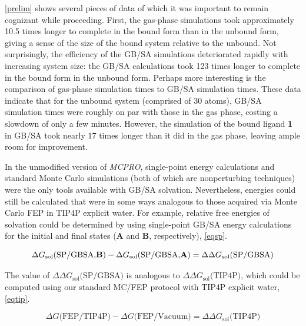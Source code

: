 \documentclass[12pt]{report}
\begin{document}
\cref{prelim} shows several pieces of data of which it was important to remain cognizant while proceeding. First, the gas-phase simulations took approximately 10.5 times longer to complete in the bound form than in the unbound form, giving a sense of the size of the bound system relative to the unbound. Not surprisingly, the efficiency of the GB/SA simulations deteriorated rapidly with increasing system size: the GB/SA calculations took 123 times longer to complete in the bound form in the unbound form. Perhaps more interesting is the comparison of gas-phase simulation times to GB/SA simulation times. These data indicate that for the unbound system (comprised of 30 atoms), GB/SA simulation times were roughly on par with those in the gas phase, costing a slowdown of only a few minutes. However, the simulation of the bound ligand \textbf{1} in GB/SA took nearly 17 times longer than it did in the gas phase, leaving ample room for improvement.

In the unmodified version of \textit{MCPRO}, single-point energy calculations and standard Monte Carlo simulations (both of which are nonperturbing techniques) were the only tools available with GB/SA solvation. Nevertheless, energies could still be calculated that were in some ways analogous to those acquired via Monte Carlo FEP in TIP4P explicit water. For example, relative free energies of solvation could be determined by using single-point GB/SA energy calculations for the initial and final states (\textbf{A} and \textbf{B}, respectively), \cref{eqsp}.

\vspace*{-0.3cm}
\begin{equation}
\label{eqsp}
\Delta G_{\textrm{sol}} \textrm{(SP/GBSA,\textbf{B})} - \Delta G_{\textrm{sol}} \textrm{(SP/GBSA,\textbf{A})} = \Delta\Delta G_{\textrm{sol}}\textrm{(SP/GBSA)}
\end{equation}

The value of $\Delta\Delta G_{\textrm{sol}}\textrm{(SP/GBSA)}$ is analogous to $\Delta\Delta G_{\textrm{sol}}\textrm{(TIP4P)}$, which could be computed using our standard MC/FEP protocol with TIP4P explicit water, \cref{eqtip}.

\begin{equation}
\label{eqtip}
\Delta G \textrm{(FEP/TIP4P)} - \Delta G \textrm{(FEP/Vacuum)} = \Delta\Delta G_{\textrm{sol}}\textrm{(TIP4P)}
\end{equation}
\vspace*{-0.8cm}
\end{document}
